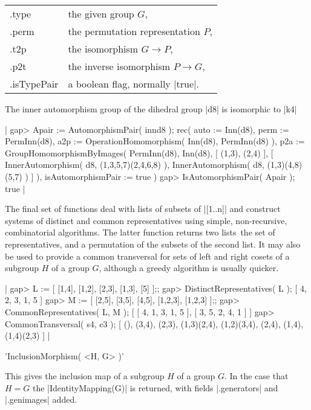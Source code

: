 {\begin{tabular}{ll}
.type         &  the given group $G$,                \\
.perm         &  the permutation representation $P$, \\
.t2p          &  the isomorphism  $G \to P$,         \\
.p2t          &  the inverse isomorphism  $P \to G$, \\
.isTypePair   &  a boolean flag, normally |true|.
\end{tabular}

The inner automorphism group of the dihedral group |d8| is 
isomorphic to |k4|\:

|    gap> Apair := AutomorphismPair( innd8 );
    rec(
      auto := Inn(d8),
      perm := PermInn(d8),
      a2p := OperationHomomorphism( Inn(d8), PermInn(d8) ),
      p2a := GroupHomomorphismByImages( PermInn(d8), Inn(d8),
        [ (1,3), (2,4) ], 
        [ InnerAutomorphism( d8, (1,3,5,7)(2,4,6,8) ), 
          InnerAutomorphism( d8, (1,3)(4,8)(5,7) ) ] ),
      isAutomorphismPair := true )
    gap> IsAutomorphismPair( Apair );
    true  |

The final set of functions deal with lists of subsets of |[1..n]|
and construct systems of distinct and common representatives using
simple, non-recursive, combinatorial algorithms.
The latter function returns two lists\:\ the set of representatives, 
and a permutation of the subsets of the second list.
It may also be used to provide a common transversal
for sets of left and right cosets of a subgroup $H$ of a group $G$,
although a greedy algorithm is usually quicker.

|    gap> L := [ [1,4], [1,2], [2,3], [1,3], [5] ];;
    gap> DistinctRepresentatives( L );
    [ 4, 2, 3, 1, 5 ]
    gap> M := [ [2,5], [3,5], [4,5], [1,2,3], [1,2,3] ];;
    gap> CommonRepresentatives( L, M );
    [ [ 4, 1, 3, 1, 5 ], [ 3, 5, 2, 4, 1 ] ]
    gap> CommonTransversal( s4, c3 );
    [ (), (3,4), (2,3), (1,3)(2,4), (1,2)(3,4), (2,4), (1,4), (1,4)(2,3) ] |

%

'InclusionMorphism( <H, G> )'

This gives the inclusion map of a subgroup $H$ of a group $G$.
In the case that  $H=G$  the |IdentityMapping(G)| is returned,
with fields  |.generators| and |.genimages|  added.

}
